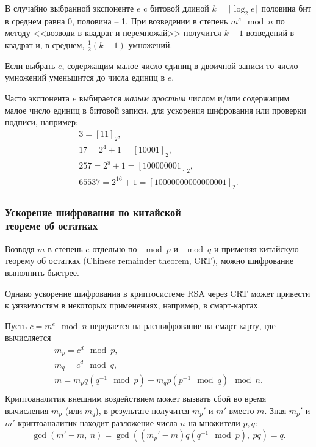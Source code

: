 В случайно выбранной экспоненте $e$ c битовой длиной $k = \lceil \log_2 e \rceil$ половина бит в среднем равна 0, половина -- 1. При возведении в степень $m^e \mod n$ по методу <<возводи в квадрат и перемножай>> получится $k-1$ возведений в квадрат и, в среднем,
 $\frac{1}{2}(k-1)$ умножений.

Если выбрать $e$, содержащим малое число единиц в двоичной записи то число умножений уменьшится до числа единиц в $e$.

Часто экспонента $e$ выбирается  \emph{малым} \emph{простым} числом и/или содержащим малое число единиц в битовой записи, для ускорения шифрования или проверки подписи, например:
\[
    \begin{array}{l}
        3 = [11]_2, \\
        17 = 2^4+1 = [10001]_2, \\
        257 = 2^8+1 = [100000001]_2, \\
        65537 = 2^{16}+1 = [10000000000000001]_2.
    \end{array}
\]



\subsubsection[Ускорение шифрования]{Ускорение шифрования по китайской \protect\\ теореме об остатках}

Возводя $m$ в степень $e$ отдельно по $\mod p$ и $\mod q$ и применяя китайскую теорему об остатках (Chinese remainder theorem, CRT), можно шифрование выполнить быстрее.

Однако ускорение шифрования в криптосистеме RSA через CRT может привести к уязвимостям в некоторых применениях, например, в смарт-картах.

\example
Пусть $c = m^e \mod n$ передается на расшифрование на смарт-карту, где вычисляется
\[ \begin{array}{c}
    m_p = c^d \mod p, \\
    m_q = c^d \mod q, \\
    m = m_p q (q^{-1} \mod p) + m_q p (p^{-1} \mod q) \mod n. \\
\end{array} \]
Криптоаналитик внешним воздействием может вызвать сбой во время вычисления $m_p$ (или $m_q$), в результате получится $m_p'$ и $m'$ вместо $m$. Зная $m_p'$ и $m'$ криптоаналитик находит разложение числа $n$ на множители $p,q$:
    \[ \gcd(m' - m, ~ n) = \gcd( (m_p' - m) q (q^{-1} \mod p), ~ pq) = q. \]
\exampleend


